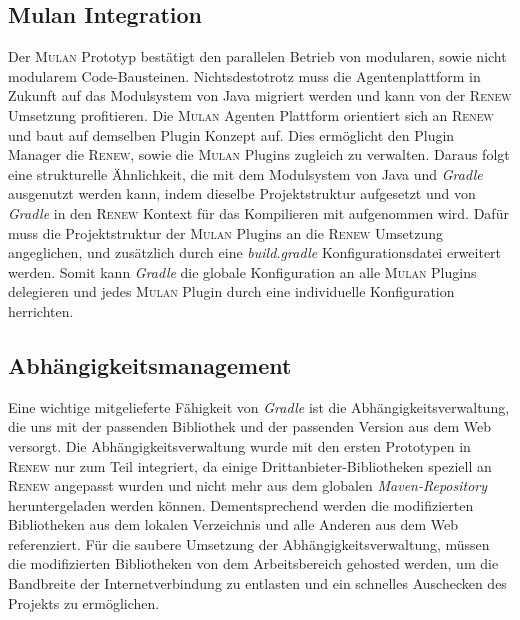  \subsection*{Mulan Integration}
	Der \textsc{Mulan} Prototyp bestätigt den parallelen Betrieb von modularen, sowie nicht modularem Code-Bausteinen. Nichtsdestotrotz muss die Agentenplattform in Zukunft auf das Modulsystem von Java migriert werden und kann von der \textsc{Renew} Umsetzung profitieren.\newline
	Die \textsc{Mulan} Agenten Plattform orientiert sich an \textsc{Renew} und baut auf demselben Plugin Konzept auf. Dies ermöglicht den Plugin Manager die \textsc{Renew}, sowie die \textsc{Mulan} Plugins zugleich zu verwalten. Daraus folgt eine strukturelle Ähnlichkeit, die mit dem Modulsystem von Java und \textit{Gradle} ausgenutzt werden kann, indem dieselbe Projektstruktur aufgesetzt und von \textit{Gradle} in den \textsc{Renew} Kontext für das Kompilieren mit aufgenommen wird.\newline
	Dafür muss die Projektstruktur der \textsc{Mulan} Plugins an die \textsc{Renew} Umsetzung angeglichen, und zusätzlich durch eine \textit{build.gradle} Konfigurationsdatei erweitert werden. Somit kann \textit{Gradle} die globale Konfiguration an alle \textsc{Mulan} Plugins delegieren und jedes \textsc{Mulan} Plugin durch eine individuelle Konfiguration herrichten. 
		
 \subsection*{Abhängigkeitsmanagement}
	Eine wichtige mitgelieferte Fähigkeit von \textit{Gradle} ist die Abhängigkeitsverwaltung, die uns mit der passenden Bibliothek und der passenden Version aus dem Web versorgt. Die Abhängigkeitsverwaltung wurde mit den ersten Prototypen in \textsc{Renew} nur zum Teil integriert, da einige Drittanbieter-Bibliotheken speziell an \textsc{Renew} angepasst wurden und nicht mehr aus dem globalen \textit{Maven-Repository} heruntergeladen werden können. Dementsprechend werden die modifizierten Bibliotheken aus dem lokalen Verzeichnis und alle Anderen aus dem Web referenziert.\newline
	Für die saubere Umsetzung der Abhängigkeitsverwaltung, müssen die modifizierten Bibliotheken von dem Arbeitsbereich gehosted werden, um die Bandbreite der Internetverbindung zu entlasten und ein schnelles Auschecken des Projekts zu ermöglichen. 	
	
